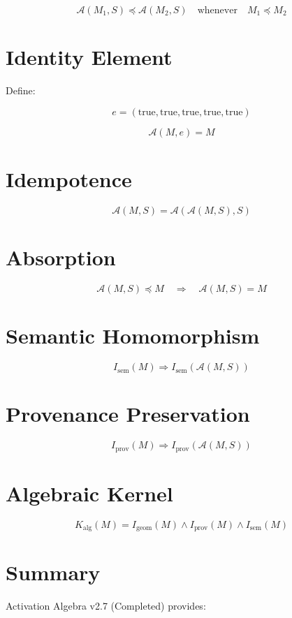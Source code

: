 \documentclass[11pt]{article}
\begin{document}
\[
\mathcal{A}(M_1, S) \preceq \mathcal{A}(M_2, S)
\quad \text{whenever} \quad M_1 \preceq M_2
\]

\section*{Identity Element}

Define:

\[
e = ( \text{true}, \text{true}, \text{true},
      \text{true}, \text{true} )
\]

\[
\mathcal{A}(M, e) = M
\]

\section*{Idempotence}

\[
\mathcal{A}(M, S) = \mathcal{A}(\mathcal{A}(M, S), S)
\]

\section*{Absorption}

\[
\mathcal{A}(M, S) \preceq M
\quad \Rightarrow \quad
\mathcal{A}(M, S) = M
\]

\section*{Semantic Homomorphism}

\[
I_{\text{sem}}(M) \Rightarrow I_{\text{sem}}(\mathcal{A}(M, S))
\]

\section*{Provenance Preservation}

\[
I_{\text{prov}}(M) \Rightarrow I_{\text{prov}}(\mathcal{A}(M, S))
\]

\section*{Algebraic Kernel}

\[
K_{\text{alg}}(M) =
  I_{\text{geom}}(M) \land I_{\text{prov}}(M) \land I_{\text{sem}}(M)
\]

\section*{Summary}

Activation Algebra v2.7 (Completed) provides:
\end{document}
